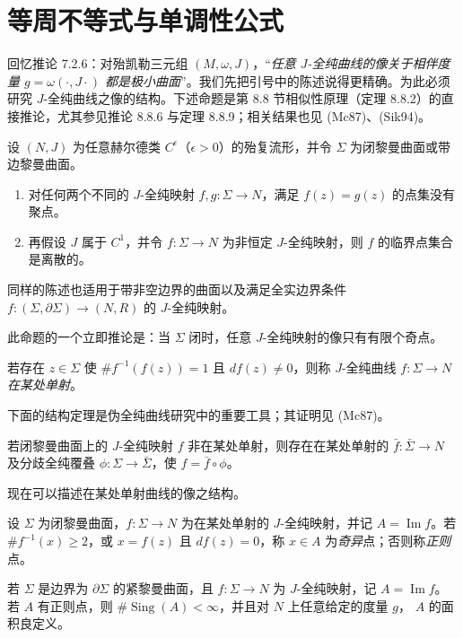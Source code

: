 \section{等周不等式与单调性公式}
\label{sec:isoperimetric-monotonicity}
回忆推论 7.2.6：对殆凯勒三元组 $(M,\omega,J)$，“\emph{任意
$J$-全纯曲线的像关于相伴度量 $g=\omega(\cdot,J\cdot)$ 都是极小曲面}”。我们先把引号中的陈述说得更精确。为此必须研究 $J$-全纯曲线之像的结构。下述命题是第 8.8 节相似性原理（定理 8.8.2）的直接推论，尤其参见推论 8.8.6 与定理 8.8.9；相关结果也见 (Mc87)、(Sik94)。
\begin{proposition}\label{prop:ch8-isolated-coincidences-critical-points}
设 $(N,J)$ 为任意赫尔德类 $C^\epsilon$（$\epsilon>0$）的殆复流形，并令
$\Sigma$ 为闭黎曼曲面或带边黎曼曲面。
\begin{enumerate}[label=(\arabic*)]
\item 对任何两个不同的 $J$-全纯映射 $f,g:\Sigma\to N$，满足
$f(z)=g(z)$ 的点集没有聚点。
\item 再假设 $J$ 属于 $C^1$，并令 $f:\Sigma\to N$ 为非恒定
$J$-全纯映射，则 $f$ 的临界点集合是离散的。
\end{enumerate}
同样的陈述也适用于带非空边界的曲面以及满足全实边界条件
$f:(\Sigma,\partial\Sigma)\to(N,R)$ 的 $J$-全纯映射。
\end{proposition}
此命题的一个立即推论是：当 $\Sigma$ 闭时，任意 $J$-全纯映射的像只有有限个奇点。
\begin{definition}\label{def:ch8-somewhere-injective}
若存在 $z\in\Sigma$ 使 $\#f^{-1}(f(z))=1$ 且 $df(z)\ne0$，则称
$J$-全纯曲线 $f:\Sigma\to N$ \emph{在某处单射}。
\end{definition}
下面的结构定理是伪全纯曲线研究中的重要工具；其证明见 (Mc87)。
\begin{theorem}[结构定理 (Mc87)]\label{thm:ch8-structure-somewhere-injective}
若闭黎曼曲面上的 $J$-全纯映射 $f$ 非在某处单射，则存在在某处单射的
$\bar f:\bar\Sigma\to N$ 及分歧全纯覆叠
$\phi:\Sigma\to\bar\Sigma$，使 $f=\bar f\circ\phi$。
\end{theorem}
现在可以描述在某处单射曲线的像之结构。
\begin{definition}\label{def:ch8-singular-image-point}
设 $\Sigma$ 为闭黎曼曲面，$f:\Sigma\to N$ 为在某处单射的
$J$-全纯映射，并记 $A=\operatorname{Im}f$。若 $\#f^{-1}(x)\geq2$，或
$x=f(z)$ 且 $df(z)=0$，称 $x\in A$ 为\emph{奇异}点；否则称\emph{正则}点。
\end{definition}
\begin{corollary}\label{cor:ch8-area-of-image-well-defined}
若 $\Sigma$ 是边界为 $\partial\Sigma$ 的紧黎曼曲面，且
$f:\Sigma\to N$ 为 $J$-全纯映射，记 $A=\operatorname{Im}f$。若 $A$ 有正则点，则
$\#\operatorname{Sing}(A)<\infty$，并且对 $N$ 上任意给定的度量 $g$，
$A$ 的面积良定义。
\end{corollary}
